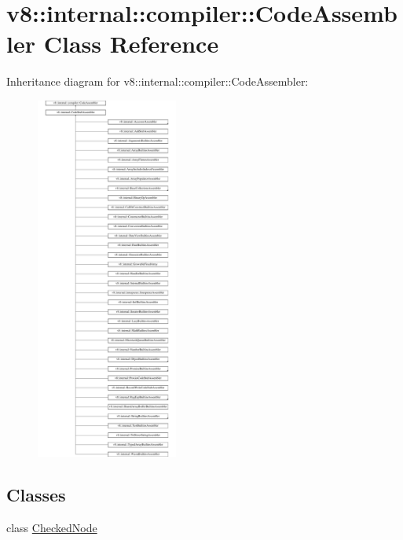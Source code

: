 \hypertarget{classv8_1_1internal_1_1compiler_1_1CodeAssembler}{}\section{v8\+:\+:internal\+:\+:compiler\+:\+:Code\+Assembler Class Reference}
\label{classv8_1_1internal_1_1compiler_1_1CodeAssembler}
Inheritance diagram for v8\+:\+:internal\+:\+:compiler\+:\+:Code\+Assembler\+:\begin{figure}[H]
\begin{center}
\leavevmode
\includegraphics[height=12.000000cm]{classv8_1_1internal_1_1compiler_1_1CodeAssembler}
\end{center}
\end{figure}
\subsection*{Classes}
\begin{DoxyCompactItemize}
\item 
class \mbox{\hyperlink{classv8_1_1internal_1_1compiler_1_1CodeAssembler_1_1CheckedNode}{Checked\+Node}}
\end{DoxyCompactItemize}
